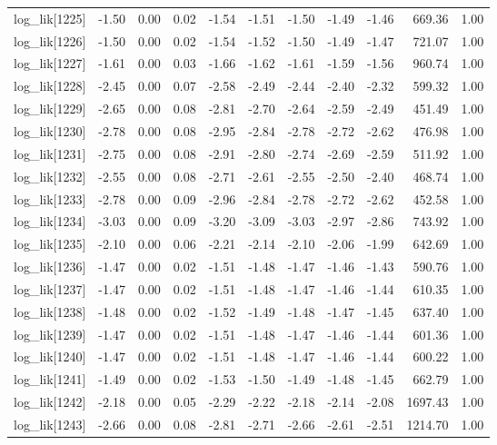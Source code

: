 \begin{table}[ht]
\begin{tabular}{rrrrrrrrrrr}
  log\_lik[1225] & -1.50 & 0.00 & 0.02 & -1.54 & -1.51 & -1.50 & -1.49 & -1.46 & 669.36 & 1.00 \\ 
  log\_lik[1226] & -1.50 & 0.00 & 0.02 & -1.54 & -1.52 & -1.50 & -1.49 & -1.47 & 721.07 & 1.00 \\ 
  log\_lik[1227] & -1.61 & 0.00 & 0.03 & -1.66 & -1.62 & -1.61 & -1.59 & -1.56 & 960.74 & 1.00 \\ 
  log\_lik[1228] & -2.45 & 0.00 & 0.07 & -2.58 & -2.49 & -2.44 & -2.40 & -2.32 & 599.32 & 1.00 \\ 
  log\_lik[1229] & -2.65 & 0.00 & 0.08 & -2.81 & -2.70 & -2.64 & -2.59 & -2.49 & 451.49 & 1.00 \\ 
  log\_lik[1230] & -2.78 & 0.00 & 0.08 & -2.95 & -2.84 & -2.78 & -2.72 & -2.62 & 476.98 & 1.00 \\ 
  log\_lik[1231] & -2.75 & 0.00 & 0.08 & -2.91 & -2.80 & -2.74 & -2.69 & -2.59 & 511.92 & 1.00 \\ 
  log\_lik[1232] & -2.55 & 0.00 & 0.08 & -2.71 & -2.61 & -2.55 & -2.50 & -2.40 & 468.74 & 1.00 \\ 
  log\_lik[1233] & -2.78 & 0.00 & 0.09 & -2.96 & -2.84 & -2.78 & -2.72 & -2.62 & 452.58 & 1.00 \\ 
  log\_lik[1234] & -3.03 & 0.00 & 0.09 & -3.20 & -3.09 & -3.03 & -2.97 & -2.86 & 743.92 & 1.00 \\ 
  log\_lik[1235] & -2.10 & 0.00 & 0.06 & -2.21 & -2.14 & -2.10 & -2.06 & -1.99 & 642.69 & 1.00 \\ 
  log\_lik[1236] & -1.47 & 0.00 & 0.02 & -1.51 & -1.48 & -1.47 & -1.46 & -1.43 & 590.76 & 1.00 \\ 
  log\_lik[1237] & -1.47 & 0.00 & 0.02 & -1.51 & -1.48 & -1.47 & -1.46 & -1.44 & 610.35 & 1.00 \\ 
  log\_lik[1238] & -1.48 & 0.00 & 0.02 & -1.52 & -1.49 & -1.48 & -1.47 & -1.45 & 637.40 & 1.00 \\ 
  log\_lik[1239] & -1.47 & 0.00 & 0.02 & -1.51 & -1.48 & -1.47 & -1.46 & -1.44 & 601.36 & 1.00 \\ 
  log\_lik[1240] & -1.47 & 0.00 & 0.02 & -1.51 & -1.48 & -1.47 & -1.46 & -1.44 & 600.22 & 1.00 \\ 
  log\_lik[1241] & -1.49 & 0.00 & 0.02 & -1.53 & -1.50 & -1.49 & -1.48 & -1.45 & 662.79 & 1.00 \\ 
  log\_lik[1242] & -2.18 & 0.00 & 0.05 & -2.29 & -2.22 & -2.18 & -2.14 & -2.08 & 1697.43 & 1.00 \\ 
  log\_lik[1243] & -2.66 & 0.00 & 0.08 & -2.81 & -2.71 & -2.66 & -2.61 & -2.51 & 1214.70 & 1.00 \\ 

\end{tabular}
\end{table}
